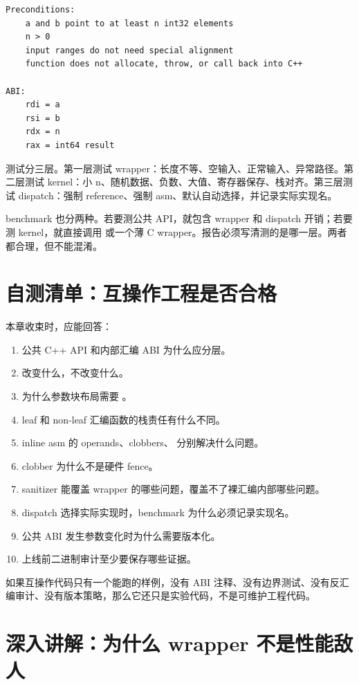 \begin{lstlisting}
Preconditions:
    a and b point to at least n int32 elements
    n > 0
    input ranges do not need special alignment
    function does not allocate, throw, or call back into C++

ABI:
    rdi = a
    rsi = b
    rdx = n
    rax = int64 result
\end{lstlisting}

测试分三层。第一层测试 wrapper：长度不等、空输入、正常输入、异常路径。第二层测试 kernel：小 n、随机数据、负数、大值、寄存器保存、栈对齐。第三层测试 dispatch：强制 reference、强制 asm、默认自动选择，并记录实际实现名。

benchmark 也分两种。若要测公共 API，就包含 wrapper 和 dispatch 开销；若要测 kernel，就直接调用  或一个薄 C wrapper。报告必须写清测的是哪一层。两者都合理，但不能混淆。

\section{自测清单：互操作工程是否合格}

本章收束时，应能回答：

\begin{enumerate}
  \item 公共 C++ API 和内部汇编 ABI 为什么应分层。
  \item {} 改变什么，不改变什么。
  \item 为什么参数块布局需要 。
  \item leaf 和 non-leaf 汇编函数的栈责任有什么不同。
  \item inline asm 的 operands、clobbers、 分别解决什么问题。
  \item {} clobber 为什么不是硬件 fence。
  \item sanitizer 能覆盖 wrapper 的哪些问题，覆盖不了裸汇编内部哪些问题。
  \item dispatch 选择实际实现时，benchmark 为什么必须记录实现名。
  \item 公共 ABI 发生参数变化时为什么需要版本化。
  \item 上线前二进制审计至少要保存哪些证据。
\end{enumerate}

如果互操作代码只有一个能跑的样例，没有 ABI 注释、没有边界测试、没有反汇编审计、没有版本策略，那么它还只是实验代码，不是可维护工程代码。

\section{深入讲解：为什么 wrapper 不是性能敌人}


